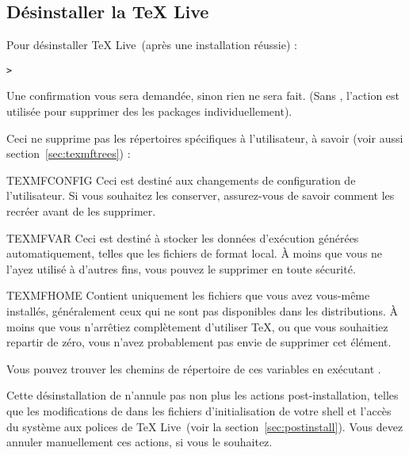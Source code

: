 \documentclass[german, english, french]{article}
\renewcommand{\TL}{\TeX{} Live\xspace}%
\begin{document}
\subsection{Désinstaller la \TL}
\label{sec:uninstall}

Pour désinstaller \TL\ (après une installation réussie) :

\begin{alltt}
> 
\end{alltt}

Une confirmation vous sera demandée, sinon rien ne sera fait.
(Sans , l'action  est utilisée pour supprimer des
les packages individuellement).

Ceci ne supprime pas les répertoires spécifiques à l'utilisateur, à savoir (voir
aussi section~\ref{sec:texmftrees}) :

\begin{ttdescription}
\item [TEXMFCONFIG] Ceci est destiné aux changements de configuration de
  l'utilisateur.  Si vous souhaitez les conserver, assurez-vous de savoir
  comment les recréer avant de les supprimer.

\item [TEXMFVAR] Ceci est destiné à stocker les données d'exécution générées
  automatiquement, telles que les fichiers de format local. À moins que vous ne
  l'ayez utilisé à d'autres fins, vous pouvez le supprimer en toute sécurité.

\item [TEXMFHOME] Contient uniquement les fichiers que vous avez vous-même
  installés, généralement ceux qui ne sont pas disponibles dans les
  distributions. À moins que vous n'arrêtiez complètement d'utiliser \TeX, ou
  que vous souhaitiez repartir de zéro, vous n'avez probablement pas envie de
  supprimer cet élément.

\end{ttdescription}

\noindent Vous pouvez trouver les chemins de répertoire de ces variables en
exécutant .

Cette désinstallation de  n'annule pas non plus les actions
post-installation, telles que les modifications de  dans les
fichiers d'initialisation de votre shell et l'accès du système aux polices de
\TL\ (voir la section~\ref{sec:postinstall}). Vous devez annuler manuellement
ces actions, si vous le souhaitez.
\end{document}
